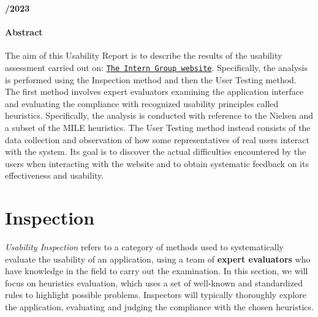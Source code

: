 \documentclass[11pt]{article} %
\begin{document}
\begin{center}
    \large \bf {}/2023
\end{center}

\thispagestyle{empty}

\setcounter{page}{0}

\newpage

\paragraph{\huge{Abstract}}
The aim of this Usability Report is to describe the results of the usability assessment carried out on: \href{https://www.theinterngroup.com}{\texttt{The Intern Group website}}. Specifically, the analysis is  performed using the Inspection method and then the User Testing method. The first method involves expert evaluators examining the application interface and evaluating the compliance with recognized usability principles called heuristics. Specifically, the analysis is conducted with reference to the Nielsen and a subset of the MILE heuristics. The User Testing method instead consists of the data collection and observation of how some representatives of real users interact with the system. Its goal is to discover the actual difficulties encountered by the users when interacting  with the website and to obtain systematic feedback on its effectiveness and usability.

\newpage

\tableofcontents 

\newpage

\section{Inspection}
\textit{Usability Inspection} refers to a category of methods used to systematically evaluate the usability of an application, using a team of \textbf{expert evaluators} who have knowledge in the field to carry out the examination. In this section, we will focus on heuristics evaluation, which uses a set of well-known and standardized rules to highlight possible problems. Inspectors will typically thoroughly explore the application, evaluating and judging the compliance with the chosen heuristics. 
\end{document}
